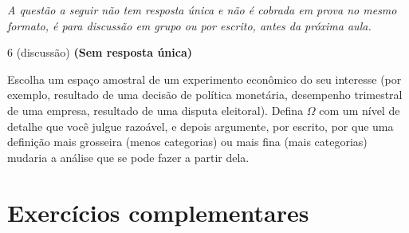 \documentclass[11pt]{article}
\begin{document}
\bigskip
\noindent\textit{A questão a seguir não tem resposta única e não é cobrada em prova no mesmo
formato, é para discussão em grupo ou por escrito, antes da próxima aula.}

\begin{questao}{6 (discussão)} \textbf{(Sem resposta única)}

Escolha um espaço amostral de um experimento econômico do seu interesse (por exemplo, resultado de
uma decisão de política monetária, desempenho trimestral de uma empresa, resultado de uma disputa
eleitoral). Defina $\Omega$ com um nível de detalhe que você julgue razoável, e depois argumente,
por escrito, por que uma definição mais grosseira (menos categorias) ou mais fina (mais categorias)
mudaria a análise que se pode fazer a partir dela.
\end{questao}


\bigskip
\section*{Exercícios complementares}
\end{document}
